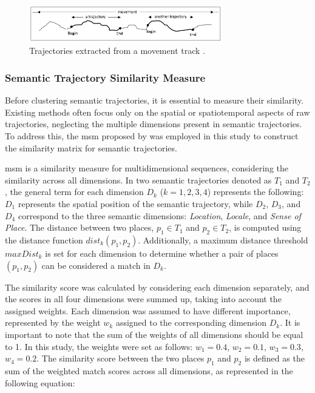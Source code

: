 \documentclass{article}
\theoremstyle{definition}
\theoremstyle{remark}
\begin{document}
\begin{figure} [!h]
\centering
\includegraphics[width=0.75\textwidth]{figures/begin_end.png}
\caption{\label{fig:trajectory_begin_end}Trajectories extracted from a movement track \citep{parent_semantic_2013}.}
\end{figure}


\subsubsection{Semantic Trajectory Similarity Measure} \label{traj_similarity}
Before clustering semantic trajectories, it is essential to measure their similarity. Existing methods often focus only on the spatial or spatiotemporal aspects of raw trajectories, neglecting the multiple dimensions present in semantic trajectories. To address this, the \acrfull{msm} proposed by \cite{furtado_multidimensional_2016} was employed in this study to construct the similarity matrix for semantic trajectories. 

\acrshort{msm} is a similarity measure for multidimensional sequences, considering the similarity across all dimensions. In two semantic trajectories denoted as $T_{1}$ and $T_{2}$, the general term for each dimension $D_{k}$ ($k = 1, 2, 3, 4$) represents the following: $D_{1}$ represents the spatial position of the semantic trajectory, while $D_{2}$, $D_{3}$, and $D_{4}$ correspond to the three semantic dimensions: \textit{Location}, \textit{Locale}, and \textit{Sense of Place}. The distance between two places, $p_{1} \in T_{1}$ and $p_{2} \in T_{2}$, is computed using the distance function $dist_{k}(p_{1},p_{2})$. Additionally, a maximum distance threshold $maxDist_{k}$ is set for each dimension to determine whether a pair of places $(p_{1},p_{2})$ can be considered a match in $D_{k}$.

The similarity score was calculated by considering each dimension separately, and the scores in all four dimensions were summed up, taking into account the assigned weights. Each dimension was assumed to have different importance, represented by the weight $w_{k}$ assigned to the corresponding dimension $D_{k}$. It is important to note that the sum of the weights of all dimensions should be equal to 1. In this study, the weights were set as follows: $w_{1}=0.4$, $w_{2}=0.1$, $w_{3}=0.3$, $w_{4}=0.2$. The similarity score between the two places $p_{1}$ and $p_{2}$ is defined as the sum of the weighted match scores across all dimensions, as represented in the following equation:
\end{document}
